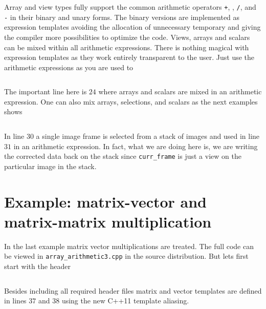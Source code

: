 Array and view types fully support the common arithmetic
operators {\tt +}, {\tt *}, {\tt /}, and {\tt -} in their binary and unary
forms. The binary versions are implemented as expression templates avoiding the
allocation of unnecessary temporary and giving the compiler more possibilities
to optimize the code. 
Views, arrays and scalars can be mixed within all arithmetic expressions. 
There is nothing magical with expression templates as they work entirely
transparent to the user. Just use the arithmetic expressions as you are used to
\inputminted[fontsize=\small,
             linenos,
             firstline=24,
             frame=lines,
             label=examples/array\_arithmetic1.cpp]
{cpp}{../examples/array_arithmetic1.cpp}
The important line here is $24$ where arrays and scalars are mixed in an
arithmetic expression.
One can also mix arrays, selections, and scalars as the next examples 
shows
\inputminted[fontsize=\small,
             linenos,
             firstline=24,
             frame=lines,
             label=examples/array\_arithmetic2.cpp]
{cpp}{../examples/array_arithmetic2.cpp}
In line $30$ a single image frame is selected from a stack of images and used in
line $31$ in an arithmetic expression. In fact, what we are doing here is,
we are writing the corrected data back on the stack since {\tt curr\_frame} is
just a view on the particular image in the stack.

\section{Example: matrix-vector and matrix-matrix multiplication}
In the last example matrix vector multiplications are treated. The full code can
be viewed in {\tt array\_arithmetic3.cpp} in the source distribution. But lets
first start with the header
\inputminted[fontsize=\small,
             linenos,
             firstline=24,
             lastline=39,
             firstnumber=24,
             frame=lines,
             label=examples/array\_arithmetic3.cpp]
{cpp}{../examples/array_arithmetic3.cpp}
Besides including all required header files matrix and vector templates are 
defined in lines $37$ and $38$ using the new C++11 template aliasing.

